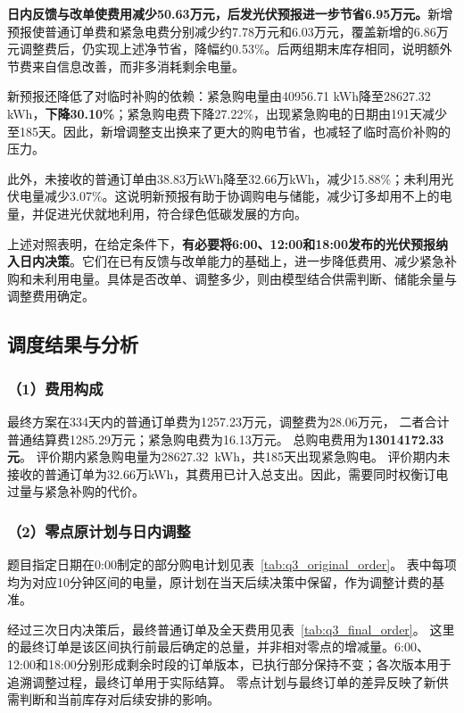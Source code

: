 \textbf{日内反馈与改单使费用减少50.63万元，后发光伏预报进一步节省6.95万元。}新增预报使普通订单费和紧急电费分别减少约7.78万元和6.03万元，覆盖新增的6.86万元调整费后，仍实现上述净节省，降幅约0.53\%。后两组期末库存相同，说明额外节费来自信息改善，而非多消耗剩余电量。

新预报还降低了对临时补购的依赖：紧急购电量由40956.71 kWh降至28627.32 kWh，\textbf{下降30.10\%}；紧急购电费下降27.22\%，出现紧急购电的日期由191天减少至185天。因此，新增调整支出换来了更大的购电节省，也减轻了临时高价补购的压力。

此外，未接收的普通订单由38.83万kWh降至32.66万kWh，减少15.88\%；未利用光伏电量减少3.07\%。这说明新预报有助于协调购电与储能，减少订多却用不上的电量，并促进光伏就地利用，符合绿色低碳发展的方向。

上述对照表明，在给定条件下，\textbf{有必要将6:00、12:00和18:00发布的光伏预报纳入日内决策}。它们在已有反馈与改单能力的基础上，进一步降低费用、减少紧急补购和未利用电量。具体是否改单、调整多少，则由模型结合供需判断、储能余量与调整费用确定。

\FloatBarrier
\subsection{调度结果与分析}\label{sec:q3_dispatch_results}

\subsubsection*{（1）费用构成}

最终方案在334天内的普通订单费为1257.23万元，调整费为28.06万元，
二者合计普通结算费1285.29万元；紧急购电费为16.13万元。
总购电费用为\textbf{13014172.33元}。
评价期内紧急购电量为28627.32~kWh，共185天出现紧急购电。
评价期内未接收的普通订单为32.66万kWh，其费用已计入总支出。因此，需要同时权衡订电过量与紧急补购的代价。

\subsubsection*{（2）零点原计划与日内调整}

题目指定日期在0:00制定的部分购电计划见表~\ref{tab:q3_original_order}。
表中每项均为对应10分钟区间的电量，原计划在当天后续决策中保留，作为调整计费的基准。



经过三次日内决策后，最终普通订单及全天费用见表~\ref{tab:q3_final_order}。
这里的最终订单是该区间执行前最后确定的总量，并非相对零点的增减量。6:00、12:00和18:00分别形成剩余时段的订单版本，已执行部分保持不变；各次版本用于追溯调整过程，最终订单用于实际结算。
零点计划与最终订单的差异反映了新供需判断和当前库存对后续安排的影响。

